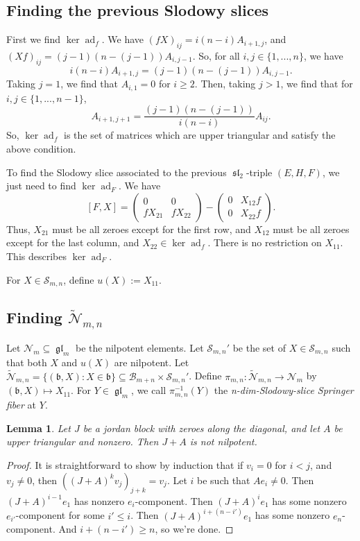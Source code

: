 \documentclass[12pt,psamsfonts]{article}
\DeclareMathOperator{\gl}{\mathfrak{gl}}
\DeclareMathOperator{\spl}{\mathfrak{sl}}
\DeclareMathOperator{\ad}{ad}
\newtheorem{lemma}[theorem]{Lemma}
\begin{document}
\subsection{Finding the previous Slodowy slices}
First we find \(\ker \ad_f\).
We have \((fX)_{ij} = i (n - i) A_{i + 1,j}\), and \((Xf)_{ij} = (j - 1) (n - (j - 1)) A_{i, j - 1}\).
So, for all \(i, j \in \{1, ..., n\}\), we have 
\[i(n - i)A_{i + 1,j} = (j - 1)(n - (j - 1))A_{i, j - 1}.\]
Taking \(j = 1\), we find that \(A_{i,1} = 0\) for \(i \geq 2\).
Then, taking \(j > 1\), we find that for \(i, j \in \{1, ..., n - 1\}\),
\[A_{i + 1, j + 1} = \frac{(j - 1)(n - (j - 1))}{i(n - i)} A_{ij}.\]
So, \(\ker\ad_f\) is the set of matrices which are upper triangular and satisfy the above condition.
\par To find the Slodowy slice associated to the previous \(\spl_2\)-triple \((E, H, F)\), we just need to find \(\ker\ad_F\).
We have 
\[[F, X] = \begin{pmatrix}
    0 & 0 \\
    f X_{21} & fX_{22}
\end{pmatrix} - \begin{pmatrix}
    0 & X_{12} f\\
    0 & X_{22} f
\end{pmatrix}.\]
Thus, \(X_{21}\) must be all zeroes except for the first row, and \(X_{12}\) must be all zeroes except for the last column, and \(X_{22} \in \ker\ad_f\).
There is no restriction on \(X_{11}\).
This describes \(\ker\ad_F\).
\par For \(X \in \mathcal{S}_{m,n}\), define \(u(X) := X_{11}\).

\subsection{Finding \(\widetilde{\mathcal{N}}_{m,n}\)}
Let \(\mathcal{N}_m \subseteq \gl_m\) be the nilpotent elements.
Let \(\mathcal{S}_{m,n}'\) be the set of \(X \in \mathcal{S}_{m,n}\) such that both \(X\) and \(u(X)\) are nilpotent.
Let \(\widetilde{\mathcal{N}}_{m,n} = \{(\mathfrak{b}, X) : X \in \mathfrak{b}\} \subseteq \mathcal{B}_{m + n} \times \mathcal{S}_{m,n}'\).
Define \(\pi_{m,n} : \widetilde{\mathcal{N}}_{m,n} \to \mathcal{N}_m\) by \((\mathfrak{b}, X) \mapsto X_{11}\).
For \(Y \in \gl_m\), we call \(\pi_{m,n}^{-1}(Y)\) the \emph{n-dim-Slodowy-slice Springer fiber} at \(Y\).

\begin{lemma}
    Let \(J\) be a jordan block with zeroes along the diagonal, and let \(A\) be upper triangular and nonzero.
    Then \(J + A\) is not nilpotent.
\end{lemma}
\begin{proof}
    It is straightforward to show by induction that if \(v_i = 0\) for \(i < j\), and \(v_j \neq 0\), then \(((J + A)^k v_j)_{j + k} = v_j\).
    Let \(i\) be such that \(Ae_i \neq 0\).
    Then \((J + A)^{i - 1} e_1\) has nonzero \(e_i\)-component.
    Then \((J + A)^i e_1\) has some nonzero \(e_{i'}\)-component for some \(i' \leq i\).
    Then \((J + A)^{i + (n - i')} e_1\) has some nonzero \(e_n\)-component.
    And \(i + (n - i') \geq n\), so we're done.
\end{proof}
\end{document}
